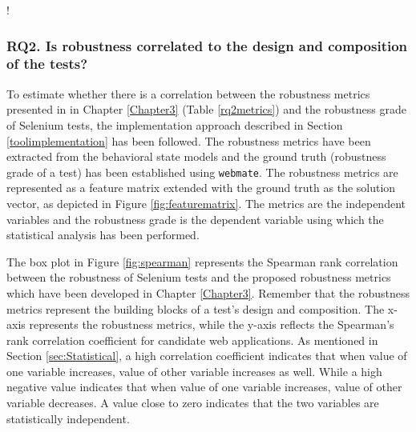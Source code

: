 !



\subsubsection*{{\bfseries RQ2.} Is robustness correlated to the design and composition of the tests?}

To estimate whether there is a correlation between the robustness metrics presented in in Chapter \ref{Chapter3} (Table \ref{rq2metrics}) and the robustness grade of Selenium tests, the implementation approach described in Section \ref{toolimplementation} has been followed. The robustness metrics have been extracted from the behavioral state models and the ground truth (robustness grade of a test) has been established using \texttt{webmate}. The robustness metrics are represented as a feature matrix extended with the ground truth as the solution vector, as depicted in Figure \ref{fig:featurematrix}. The metrics are the independent variables and the robustness grade is the dependent variable using which the statistical analysis has been performed.

The box plot in Figure \ref{fig:spearman} represents the Spearman rank correlation between the robustness of Selenium tests and the proposed robustness metrics which have been developed in Chapter \ref{Chapter3}. Remember that the robustness metrics represent the building blocks of a test's design and composition. The x-axis represents the robustness metrics, while the y-axis reflects the Spearman's rank correlation coefficient for candidate web applications. As mentioned in Section \ref{sec:Statistical}, a high correlation coefficient indicates that when value of one variable increases, value of other variable increases as well. While a high negative value indicates that when value of one variable increases, value of other variable decreases. A value close to zero indicates that the two variables are statistically independent. 

